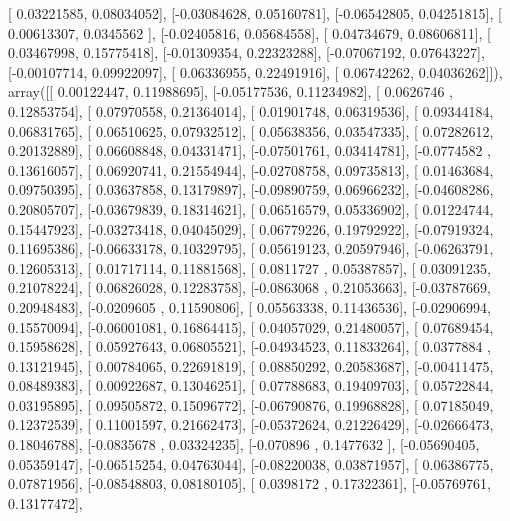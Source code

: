 \documentclass{article}
\begin{document}
       [ 0.03221585,  0.08034052],
       [-0.03084628,  0.05160781],
       [-0.06542805,  0.04251815],
       [ 0.00613307,  0.0345562 ],
       [-0.02405816,  0.05684558],
       [ 0.04734679,  0.08606811],
       [ 0.03467998,  0.15775418],
       [-0.01309354,  0.22323288],
       [-0.07067192,  0.07643227],
       [-0.00107714,  0.09922097],
       [ 0.06336955,  0.22491916],
       [ 0.06742262,  0.04036262]]), array([[ 0.00122447,  0.11988695],
       [-0.05177536,  0.11234982],
       [ 0.0626746 ,  0.12853754],
       [ 0.07970558,  0.21364014],
       [ 0.01901748,  0.06319536],
       [ 0.09344184,  0.06831765],
       [ 0.06510625,  0.07932512],
       [ 0.05638356,  0.03547335],
       [ 0.07282612,  0.20132889],
       [ 0.06608848,  0.04331471],
       [-0.07501761,  0.03414781],
       [-0.0774582 ,  0.13616057],
       [ 0.06920741,  0.21554944],
       [-0.02708758,  0.09735813],
       [ 0.01463684,  0.09750395],
       [ 0.03637858,  0.13179897],
       [-0.09890759,  0.06966232],
       [-0.04608286,  0.20805707],
       [-0.03679839,  0.18314621],
       [ 0.06516579,  0.05336902],
       [ 0.01224744,  0.15447923],
       [-0.03273418,  0.04045029],
       [ 0.06779226,  0.19792922],
       [-0.07919324,  0.11695386],
       [-0.06633178,  0.10329795],
       [ 0.05619123,  0.20597946],
       [-0.06263791,  0.12605313],
       [ 0.01717114,  0.11881568],
       [ 0.0811727 ,  0.05387857],
       [ 0.03091235,  0.21078224],
       [ 0.06826028,  0.12283758],
       [-0.0863068 ,  0.21053663],
       [-0.03787669,  0.20948483],
       [-0.0209605 ,  0.11590806],
       [ 0.05563338,  0.11436536],
       [-0.02906994,  0.15570094],
       [-0.06001081,  0.16864415],
       [ 0.04057029,  0.21480057],
       [ 0.07689454,  0.15958628],
       [ 0.05927643,  0.06805521],
       [-0.04934523,  0.11833264],
       [ 0.0377884 ,  0.13121945],
       [ 0.00784065,  0.22691819],
       [ 0.08850292,  0.20583687],
       [-0.00411475,  0.08489383],
       [ 0.00922687,  0.13046251],
       [ 0.07788683,  0.19409703],
       [ 0.05722844,  0.03195895],
       [ 0.09505872,  0.15096772],
       [-0.06790876,  0.19968828],
       [ 0.07185049,  0.12372539],
       [ 0.11001597,  0.21662473],
       [-0.05372624,  0.21226429],
       [-0.02666473,  0.18046788],
       [-0.0835678 ,  0.03324235],
       [-0.070896  ,  0.1477632 ],
       [-0.05690405,  0.05359147],
       [-0.06515254,  0.04763044],
       [-0.08220038,  0.03871957],
       [ 0.06386775,  0.07871956],
       [-0.08548803,  0.08180105],
       [ 0.0398172 ,  0.17322361],
       [-0.05769761,  0.13177472],
\end{document}
